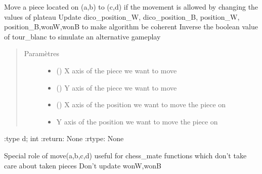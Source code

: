 \documentclass[letterpaper,10pt,french]{sphinxmanual}
\begin{document}
\begin{fulllineitems}
\label{\detokenize{autodoc:echecs.move}}
Move a piece located on (a,b) to (c,d) if the movement is allowed by changing the values of plateau
Update dico\_position\_W, dico\_position\_B, position\_W, position\_B,wonW,wonB to make algorithm be coherent
Inverse the boolean value of tour\_blanc to simulate an alternative gameplay
\begin{quote}\begin{description}
\item[{Paramètres}] \leavevmode\begin{itemize}
\item {} 
 () \textendash{} X axis of the piece we want to move

\item {} 
 () \textendash{} Y axis of the piece we want to move

\item {} 
 () \textendash{} X axis of the position we want to move the piece on

\item {} 
 \textendash{} Y axis of the position we want to move the piece on

\end{itemize}

\end{description}\end{quote}

:type d; int
:return: None
:rtype: None

\end{fulllineitems}


\begin{fulllineitems}
\label{\detokenize{autodoc:echecs.move_IA_black}}
\end{fulllineitems}


\begin{fulllineitems}
\label{\detokenize{autodoc:echecs.move_chess}}
Special role of move(a,b,c,d) useful for chess\_mate functions which don’t take care about taken pieces
Don’t update wonW,wonB

\end{fulllineitems}
\end{document}
